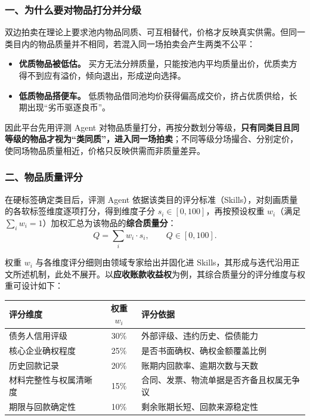 \documentclass[UTF8,a4paper,12pt]{ctexart}
\begin{document}
\subsubsection*{一、为什么要对物品打分并分级}

双边拍卖在理论上要求池内物品同质、可互相替代，价格才反映真实供需。但同一类目内的物品质量并不相同，若混入同一场拍卖会产生两类不公平：

\begin{itemize}
    \item \textbf{优质物品被低估。} 买方无法分辨质量，只能按池内平均质量出价，优质卖方得不到应有溢价，倾向退出，形成逆向选择。
    \item \textbf{低质物品搭便车。} 低质物品借同池均价获得偏高成交价，挤占优质供给，长期出现“劣币驱逐良币”。
\end{itemize}

因此平台先用评测 Agent 对物品质量打分，再按分数划分等级，\textbf{只有同类目且同等级的物品才视为“类同质”，进入同一场拍卖}；不同等级分场撮合、分别定价，使同场物品质量相近，价格只反映供需而非质量差异。

\subsubsection*{二、物品质量评分}

在硬标签确定类目后，评测 Agent 依据该类目的评分标准（Skills），对刻画质量的各软标签维度逐项打分，得到维度子分 $s_i \in [0,100]$，再按预设权重 $w_i$（满足 $\sum_i w_i = 1$）加权汇总为该物品的\textbf{综合质量分}：
\[
    Q = \sum_i w_i \cdot s_i, \qquad Q \in [0,100].
\]

权重 $w_i$ 与各维度评分细则由领域专家给出并固化进 Skills，其形成与迭代沿用正文所述机制，此处不展开。以\textbf{应收账款收益权}为例，其综合质量分的评分维度与权重可设计如下：

\begin{center}
    \begin{tabular}{l c l}
        \toprule
        评分维度        & 权重 $w_i$ & 评分依据                 \\
        \midrule
        债务人信用评级     & 30\%     & 外部评级、违约历史、偿债能力       \\
        核心企业确权程度    & 25\%     & 是否书面确权、确权金额覆盖比例      \\
        历史回款记录      & 20\%     & 账期内回款率、逾期次数与天数       \\
        材料完整性与权属清晰度 & 15\%     & 合同、发票、物流单据是否齐备且权属无争议 \\
        期限与回款确定性    & 10\%     & 剩余账期长短、回款来源稳定性       \\
        \bottomrule
    \end{tabular}
\end{center}
\end{document}
